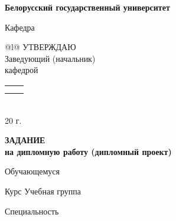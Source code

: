 \begin{center}
\textbf{\large Белорусский государственный университет}
\end{center}

\noindent Кафедра 

\vspace{0.2cm}

\begin{flushright}
\begin{tabular}{@{}l@{}}
УТВЕРЖДАЮ \\
Заведующий (начальник) \\
кафедрой \\[0.2cm]
\begin{tabular}{@{}l@{\hspace{1.8cm}}l@{}}
\ufield{4.2cm}{} & \ufield{5.5cm}{Саечников В.А.} \\
\makebox[4.2cm][c]{\scriptsize (подпись)} & \makebox[5.5cm][c]{\scriptsize (фамилия, инициалы)}
\end{tabular} \\[0.8cm]
\ufield{3cm}{} 20\ufield{1cm}{} г.
\end{tabular}
\end{flushright}

\begin{center}
\textbf{\large ЗАДАНИЕ} \\
\textbf{\large на дипломную работу (дипломный проект)}
\end{center}

\noindent Обучающемуся  \\
\hspace*{3.2cm}

\noindent Курс  \hspace{1.5cm} Учебная группа 

\noindent Специальность  \\
 \\

